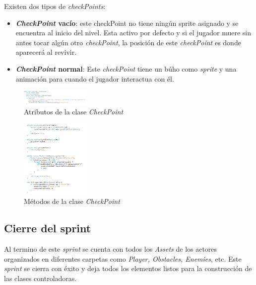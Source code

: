 Existen dos tipos de \textit{checkPoints}: 
	\begin{itemize}
		\item \textbf{\textit{CheckPoint} vacío}: este checkPoint no tiene ningún 
		sprite asignado y se encuentra al inicio del nivel. Esta activo por defecto 
		y si el jugador muere sin antes tocar algún otro \textit{checkPoint}, la 
		posición de este \textit{checkPoint} es donde aparecerá al revivir.
		\item \textbf{\textit{CheckPoint} normal}: Este \textit{checkPoint} tiene un 
		búho como \textit{sprite} y una animación para cuando el jugador interactua con 
		él.
	\end{itemize}
	
\begin{figure}[h]
    			\centering
    			\includegraphics[width=0.3\textwidth]{03TrabajoRealizado/imagenes/checkpoint.png}
    			\caption{Atributos de la clase \textit{CheckPoint}}
    			\label{fig:CheckAtri}	
\end{figure}

\begin{figure}[h]
    			\centering
    			\includegraphics[width=0.3\textwidth]{03TrabajoRealizado/imagenes/checkpointmethods.png}
    			\caption{Métodos de la clase \textit{CheckPoint}}
    			\label{fig:CheckMethod}	
\end{figure}

\subsection{Cierre del sprint}
Al termino de este \textit{sprint} se cuenta con todos los \textit{Assets} de 
los actores organizados en diferentes carpetas como \textit{Player, Obstacles, Enemies}, 
etc. Este \textit{sprint} se cierra con éxito y deja todos los elementos listos 
para la construcción de las clases controladoras. 